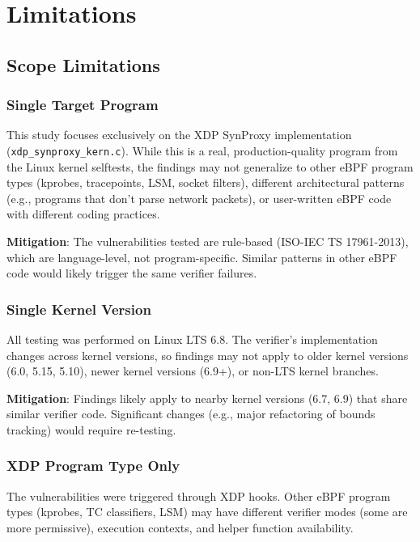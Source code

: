\chapter{Limitations}
\label{ch:limitations}

\section{Scope Limitations}

\subsection{Single Target Program}

This study focuses exclusively on the XDP SynProxy implementation (\texttt{xdp\_synproxy\_kern.c}). While this is a real, production-quality program from the Linux kernel selftests, the findings may not generalize to other eBPF program types (kprobes, tracepoints, LSM, socket filters), different architectural patterns (e.g., programs that don't parse network packets), or user-written eBPF code with different coding practices.

\textbf{Mitigation}: The vulnerabilities tested are rule-based (ISO-IEC TS 17961-2013), which are language-level, not program-specific. Similar patterns in other eBPF code would likely trigger the same verifier failures.

\subsection{Single Kernel Version}

All testing was performed on Linux LTS 6.8. The verifier's implementation changes across kernel versions, so findings may not apply to older kernel versions (6.0, 5.15, 5.10), newer kernel versions (6.9+), or non-LTS kernel branches.

\textbf{Mitigation}: Findings likely apply to nearby kernel versions (6.7, 6.9) that share similar verifier code. Significant changes (e.g., major refactoring of bounds tracking) would require re-testing.

\subsection{XDP Program Type Only}

The vulnerabilities were triggered through XDP hooks. Other eBPF program types (kprobes, TC classifiers, LSM) may have different verifier modes (some are more permissive), execution contexts, and helper function availability.

